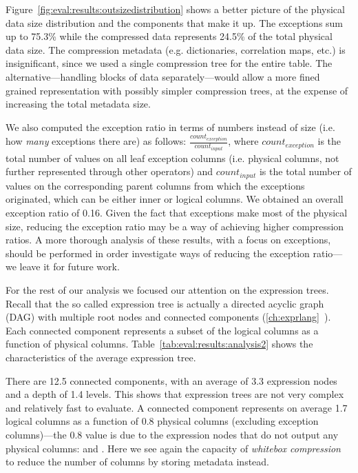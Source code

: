 Figure~\ref{fig:eval:results:outsizedistribution} shows a better picture of the physical data size distribution and the components that make it up. The exceptions sum up to 75.3\% while the compressed data represents 24.5\% of the total physical data size. The compression metadata (e.g. dictionaries, correlation maps, etc.) is insignificant, since we used a single compression tree for the entire table. The alternative---handling blocks of data separately---would allow a more fined grained representation with possibly simpler compression trees, at the expense of increasing the total metadata size. 

We also computed the exception ratio in terms of numbers instead of size (i.e. how \textit{many} exceptions there are) as follows: \(\frac{count_{exception}}{count_{input}}\), where \(count_{exception}\) is the total number of values on all leaf exception columns (i.e. physical columns, not further represented through other operators) and \(count_{input}\) is the total number of values on the corresponding parent columns from which the exceptions originated, which can be either inner or logical columns. We obtained an overall exception ratio of 0.16. Given the fact that exceptions make most of the physical size, reducing the exception ratio may be a way of achieving higher compression ratios. A more thorough analysis of these results, with a focus on exceptions, should be performed in order investigate ways of reducing the exception ratio---we leave it for future work.

For the rest of our analysis we focused our attention on the expression trees. Recall that the so called expression tree is actually a directed acyclic graph (DAG) with multiple root nodes and connected components (\ref{ch:exprlang}~). Each connected component represents a subset of the logical columns as a function of physical columns. Table~\ref{tab:eval:results:analysis2} shows the characteristics of the average expression tree.



There are 12.5 connected components, with an average of 3.3 expression nodes and a depth of 1.4 levels. This shows that expression trees are not very complex and relatively fast to evaluate. A connected component represents on average 1.7 logical columns as a function of 0.8 physical columns (excluding exception columns)---the 0.8 value is due to the expression nodes that do not output any physical columns:  and . Here we see again the capacity of \textit{whitebox compression} to reduce the number of columns by storing metadata instead.

